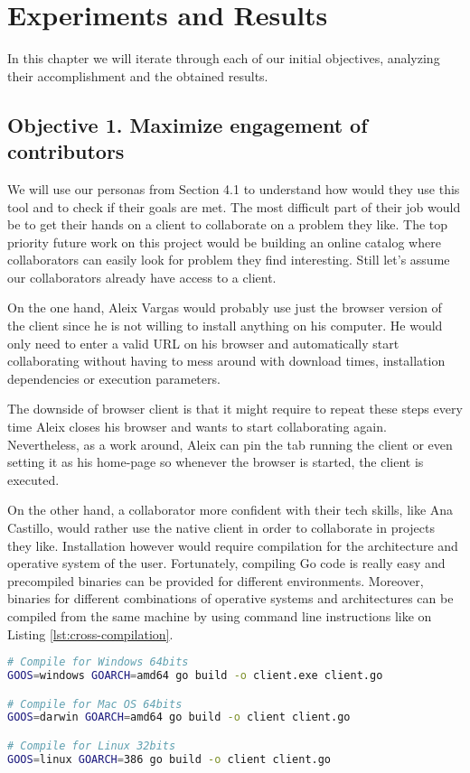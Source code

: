 \chapter{Experiments and Results}

In this chapter we will iterate through each of our initial objectives, analyzing their accomplishment and the obtained results.

\section{Objective 1. Maximize engagement of contributors}

We will use our personas from Section 4.1 to understand how would they use this tool and to check if their goals are met. The most difficult part of their job would be to get their hands on a client to collaborate on a problem they like. The top priority future work on this project would be building an online catalog where collaborators can easily look for problem they find interesting. Still let's assume our collaborators already have access to a client.

On the one hand, Aleix Vargas would probably use just the browser version of the client since he is not willing to install anything on his computer. He would only need to enter a valid URL on his browser and automatically start collaborating without having to mess around with download times, installation dependencies or execution parameters. 

The downside of browser client is that it might require to repeat these steps every time Aleix closes his browser and wants to start collaborating again. Nevertheless, as a work around, Aleix can pin the tab running the client or even setting it as his home-page so whenever the browser is started, the client is executed.

On the other hand, a collaborator more confident with their tech skills, like Ana Castillo, would rather use the native client in order to collaborate in projects they like. Installation however would require compilation for the architecture and operative system of the user. Fortunately, compiling Go code is really easy and precompiled binaries can be provided for different environments. Moreover, binaries for different combinations of operative systems and architectures can be compiled from the same machine by using command line instructions like on Listing \ref{lst:cross-compilation}.

\begin{lstlisting}[language=bash,
caption={Cross-compilation of client for different operative systems and architectures from the same Linux machine.},
label={lst:cross-compilation},
captionpos=b]
# Compile for Windows 64bits
GOOS=windows GOARCH=amd64 go build -o client.exe client.go

# Compile for Mac OS 64bits
GOOS=darwin GOARCH=amd64 go build -o client client.go

# Compile for Linux 32bits
GOOS=linux GOARCH=386 go build -o client client.go
\end{lstlisting} 

